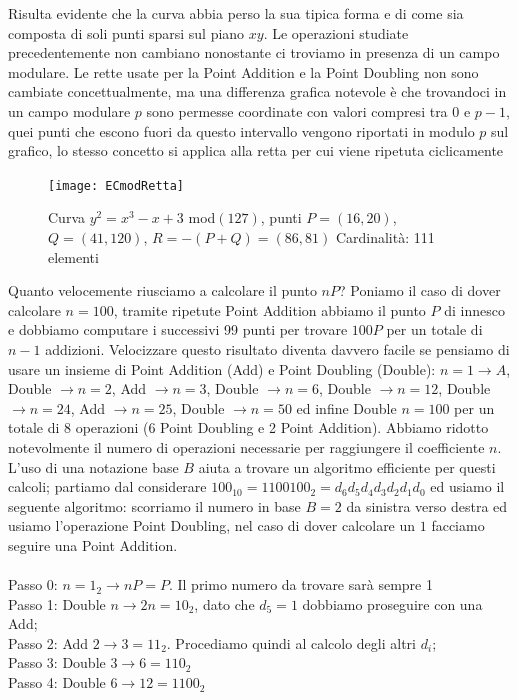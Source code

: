 \documentclass[a4paper,12pt]{tesiinfo}
\begin{document}
Risulta evidente che la curva abbia perso la sua tipica forma e di come sia composta di soli punti sparsi sul piano $xy$. Le operazioni studiate precedentemente non cambiano nonostante ci troviamo in presenza di un campo modulare. Le rette usate per la Point Addition e la Point Doubling non sono cambiate concettualmente, ma una differenza grafica notevole \`e che trovandoci in un campo modulare $p$ sono permesse coordinate con valori compresi tra $0$ e $p-1$, quei punti che escono fuori da questo intervallo vengono riportati in modulo $p$ sul grafico, lo stesso concetto si applica alla retta per cui viene ripetuta ciclicamente
\begin{figure}[ht]
    \texttt{[image: ECmodRetta]}
    \caption{Curva $y^2=x^3-x+3$ mod$(127)$, punti $P = (16, 20)$, $Q=(41, 120)$, $R = -(P+Q) = (86, 81)$ Cardinalit\`a: 111 elementi}
\end{figure}
Quanto velocemente riusciamo a calcolare il punto $nP$? Poniamo il caso di dover calcolare $n=100$, tramite ripetute Point Addition abbiamo il punto $P$ di innesco e dobbiamo computare i successivi 99 punti per trovare $100P$ per un totale di $n-1$ addizioni. Velocizzare questo risultato diventa davvero facile se pensiamo di usare un insieme di Point Addition (Add) e Point Doubling (Double): $n=1 \to A$, Double $\to n=2$, Add $\to n=3$, Double $\to n=6$, Double $\to n=12$, Double $\to n=24$, Add $\to n=25$, Double $\to n=50$ ed infine Double $n=100$ per un totale di 8 operazioni (6 Point Doubling e 2 Point Addition). Abbiamo ridotto notevolmente il numero di operazioni necessarie per raggiungere il coefficiente $n$. 
\\
L'uso di una notazione base $B$ aiuta a trovare un algoritmo efficiente per questi calcoli; partiamo dal considerare $100_{10} = 1100100_2 = d_6d_5d_4d_3d_2d_1d_0$ ed usiamo il seguente algoritmo: scorriamo il numero in base $B=2$ da sinistra verso destra ed usiamo l'operazione Point Doubling, nel caso di dover calcolare un $1$ facciamo seguire una Point Addition. 
\\
\\
Passo 0: $n=1_2 \to nP = P$. Il primo numero da trovare sar\`a sempre 1\\
Passo 1: Double $n \to 2n = 10_2$, dato che $d_5 = 1$ dobbiamo proseguire con una Add;\\
Passo 2: Add    $2 \to 3 = 11_2$. Procediamo quindi al calcolo degli altri $d_i$;\\
Passo 3: Double $3 \to 6 = 110_2$\\
Passo 4: Double $6 \to 12 = 1100_2$\\
\end{document}
